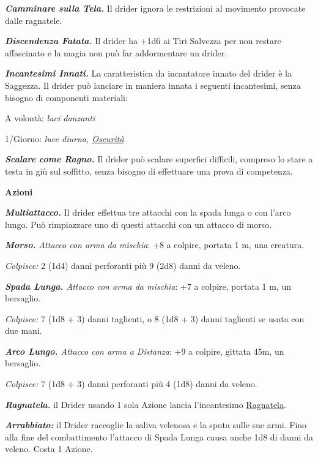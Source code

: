 \begin{multicols}{2}
{\emph{\textbf{Camminare sulla Tela.}} Il drider ignora le restrizioni al movimento provocate dalle ragnatele.

\emph{\textbf{Discendenza Fatata.}} Il drider ha +1d6 ai Tiri Salvezza per non restare affascinato e la magia non può far addormentare un drider.

\emph{\textbf{Incantesimi Innati.}} La caratteristica da incantatore innato del drider è la Saggezza. Il drider può lanciare in maniera innata i seguenti incantesimi, senza bisogno di componenti materiali:

A volontà: \emph{luci danzanti}

1/Giorno: \emph{luce diurna, \hyperlink{Oscurità}{Oscurità}}

\emph{\textbf{Scalare come Ragno.}} Il drider può scalare superfici difficili, compreso lo stare a testa in giù sul soffitto, senza bisogno di effettuare una prova di competenza.

\textbf{Azioni}

\emph{\textbf{Multiattacco.}} Il drider effettua tre attacchi con la spada lunga o con l'arco lungo. Può rimpiazzare uno di questi attacchi con un attacco di morso.

\emph{\textbf{Morso.} Attacco con arma da mischia}: +8 a colpire, portata 1 m, una creatura.

\emph{Colpisce:} 2 (1d4) danni perforanti più 9 (2d8) danni da veleno.

\emph{\textbf{Spada Lunga.} Attacco con arma da mischia}: +7 a colpire, portata 1 m, un bersaglio.

\emph{Colpisce:} 7 (1d8 + 3) danni taglienti, o 8 (1d8 + 3) danni taglienti se usata con due mani.

\emph{\textbf{Arco Lungo.} Attacco con arma a Distanza}: +9 a colpire, gittata 45m, un bersaglio.

\emph{Colpisce:} 7 (1d8 + 3) danni perforanti più 4 (1d8) danni da veleno.

\emph{\textbf{Ragnatela.}} il Drider usando 1 sola Azione lancia l'incantesimo \hyperlink{Ragnatela}{Ragnatela}.

\emph{\textbf{Arrabbiato:}} il Drider raccoglie la saliva velenosa e la sputa sulle sue armi. Fino alla fine del combattimento l'attacco di Spada Lunga causa anche 1d8 di danni da veleno. Costa 1 Azione.

}
\end{multicols}
